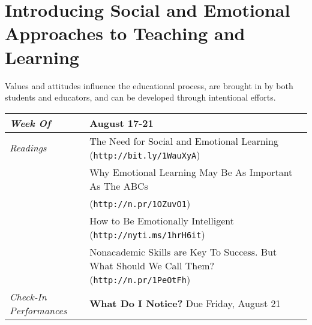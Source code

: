 \documentclass{article}
\newcommand{\gentopic}[1]{\begin{center}\faKey\hspace{1em}\textsf{#1}\end{center}}
\newcommand{\tabread}{\faBook\hspace{1em}\textit{Readings}}
\newcommand{\tabdt}{\faCalendar\hspace{1em}\textit{Week Of}}
\newcommand{\tabcheckin}{\raggedright\faCheckSquareO\hspace{1em}\textit{Check-In Performances}}
\newenvironment{tabsched}
	{\small
	\begin{tabular}{p{1.5in}p{4.5in}}
	\midrule}
	{\midrule
	\end{tabular}
	\normalsize}
\newcommand{\weekone}{August 17-21}
\newcommand{\url}[1]{\footnotesize\texttt{#1}\normalsize}
\begin{document}
\section{Introducing Social and Emotional Approaches to Teaching and Learning}

\gentopic{Values and attitudes influence the educational process, are brought in by both students and educators, and can be developed through intentional efforts.}


\begin{tabsched}
	\tabdt & \weekone \\
	\midrule
	\tabread & The Need for Social and Emotional Learning (\url{http://bit.ly/1WauXyA}) \\
	& Why Emotional Learning May Be As Important As The ABCs \\
	& (\url{http://n.pr/1OZuvO1}) \\
	& How to Be Emotionally Intelligent (\url{\texttt{http://nyti.ms/1hrH6it}}) \\
	& Nonacademic Skills are Key To Success. But What Should We Call Them?  (\url{http://n.pr/1PeOtFh}) \\
	\midrule
	\tabcheckin & \textbf{What Do I Notice?} Due Friday, August 21 \\
\end{tabsched}
\end{document}
